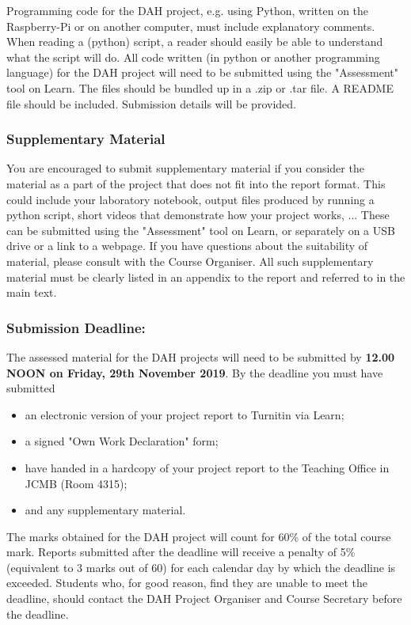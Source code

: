 Programming code for the DAH project, e.g. using Python, written on the Raspberry-Pi or on another computer, must include explanatory comments. When reading a (python) script, a reader should easily be able to understand what the script will do. All code written (in python or another programming language)  for the DAH project will need to be submitted using the "Assessment" tool on Learn.  The files should be bundled up in a .zip or .tar file. A README file should be included. Submission details will be provided.

\subsubsection{Supplementary Material}

You are encouraged to submit supplementary material if you consider the material as a part of the project that does not fit into the report format. This could include your laboratory notebook, output files produced by running a python script, short videos that demonstrate how your project works, ... These can be submitted  using the "Assessment" tool on Learn, or separately on a USB drive or a link to a webpage. If you have questions about the suitability of material, please consult with the Course Organiser. All such supplementary material must be clearly listed in an appendix to the report and referred to in the main text. 

\subsubsection{Submission Deadline:}
The assessed material for the DAH projects will need to be submitted by {\bf 12.00 NOON on Friday, 29th November 2019}. By the deadline you must have submitted 
\begin{itemize}
\item an electronic version of your project report to Turnitin via Learn;
\item a signed "Own Work Declaration" form;
\item have handed in a hardcopy of your project report
 to the Teaching Office in JCMB (Room 4315);
\item and any supplementary material. 
\end{itemize}
The marks obtained for the DAH project will count for 60\% of the total course mark. 
Reports submitted after the deadline will receive a penalty of 5\% (equivalent to 3 marks out of 60) for each calendar day by which the deadline is exceeded. Students who, for good reason, find they are unable to meet the deadline, should contact the DAH Project Organiser and Course Secretary before
the deadline.

